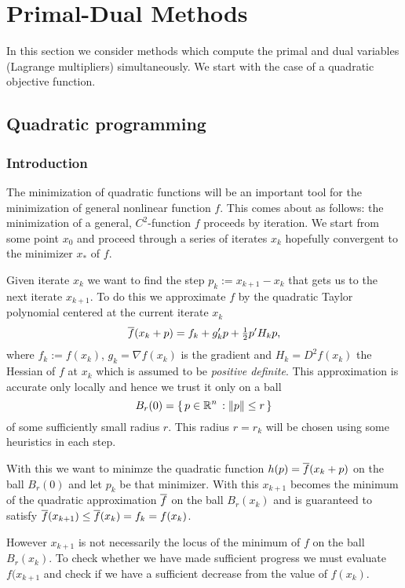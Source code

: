 \chapter{Primal-Dual Methods}

In this section we consider methods which compute the primal and dual variables
(Lagrange multipliers) simultaneously. We start with the case of a quadratic objective function.

\section{Quadratic programming}

\subsection{Introduction}
\label{subsec:qp_intro}

The minimization of quadratic functions will be an important tool for the minimization of
general nonlinear function $f$. This comes about as follows: the minimization of a general,
$C^2$-function $f$ proceeds by iteration. We start from some point $x_0$ and proceed through 
a series of iterates $x_k$ hopefully convergent to the minimizer $x_*$ of $f$. 

Given iterate $x_k$ we want to find the step $p_k:= x_{k+1}-x_k$ that gets us to the next  
iterate $x_{k+1}$. To do this we approximate $f$ by the quadratic Taylor polynomial centered at
the current iterate $x_k$
%
\begin{equation}
\label{TP2}
\overline f(x_k+p) = f_k + g_k'p+\tfrac{1}{2}p'H_kp,
\end{equation}  
%
where $f_k:=f(x_k)$, $g_k=\nabla  f(x_k)$ is the gradient and $H_k=D^2f(x_k)$ the Hessian of $f$ 
at $x_k$ which is assumed to be \textit{positive definite}. This approximation is accurate only 
locally and hence we trust it only on a ball
$$
B_r(0)=\{\thinspace p\in{\mathbb R}^n\thinspace:\left\|p\right\|\leq r\thinspace\}
$$
of some sufficiently small radius $r$. This radius $r=r_k$ will be chosen using some heuristics 
in each step.

With this we want to minimze the quadratic function $h(p)=\overline f(x_k+p)$ on the ball $B_r(0)$
and let $p_k$ be that minimizer. With this $x_{k+1}$ becomes the minimum of the quadratic 
approximation $\overline f$ on the ball $B_r(x_k)$ and is guaranteed to satisfy 
$\overline f(x_{k+1})\leq \overline f(x_k)=f_k=f(x_k)$.

However $x_{k+1}$ is not necessarily the locus of the minimum of $f$ on the ball $B_r(x_k)$.
To check whether we have made sufficient progress we must evaluate $f(x_{k+1}$ and check if we   
have a sufficient decrease from the value of $f(x_k)$.

